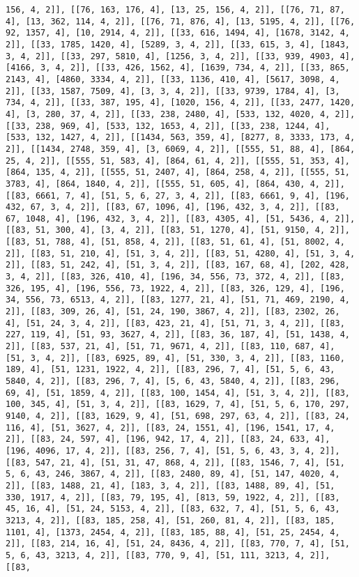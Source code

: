 \documentclass[12pt,fleqn]{article}\usepackage{../../common}
\begin{document}
\begin{verbatim}
156, 4, 2]], [[76, 163, 176, 4], [13, 25, 156, 4, 2]], [[76, 71, 87, 4], [13, 362, 114, 4, 2]], [[76, 71, 876, 4], [13, 5195, 4, 2]], [[76, 92, 1357, 4], [10, 2914, 4, 2]], [[33, 616, 1494, 4], [1678, 3142, 4, 2]], [[33, 1785, 1420, 4], [5289, 3, 4, 2]], [[33, 615, 3, 4], [1843, 3, 4, 2]], [[33, 297, 5810, 4], [1256, 3, 4, 2]], [[33, 939, 4903, 4], [4166, 3, 4, 2]], [[33, 426, 1562, 4], [1639, 734, 4, 2]], [[33, 865, 2143, 4], [4860, 3334, 4, 2]], [[33, 1136, 410, 4], [5617, 3098, 4, 2]], [[33, 1587, 7509, 4], [3, 3, 4, 2]], [[33, 9739, 1784, 4], [3, 734, 4, 2]], [[33, 387, 195, 4], [1020, 156, 4, 2]], [[33, 2477, 1420, 4], [3, 280, 37, 4, 2]], [[33, 238, 2480, 4], [533, 132, 4020, 4, 2]], [[33, 238, 969, 4], [533, 132, 1653, 4, 2]], [[33, 238, 1244, 4], [533, 132, 1427, 4, 2]], [[1434, 563, 359, 4], [8277, 8, 3333, 173, 4, 2]], [[1434, 2748, 359, 4], [3, 6069, 4, 2]], [[555, 51, 88, 4], [864, 25, 4, 2]], [[555, 51, 583, 4], [864, 61, 4, 2]], [[555, 51, 353, 4], [864, 135, 4, 2]], [[555, 51, 2407, 4], [864, 258, 4, 2]], [[555, 51, 3783, 4], [864, 1840, 4, 2]], [[555, 51, 605, 4], [864, 430, 4, 2]], [[83, 6661, 7, 4], [51, 5, 6, 27, 3, 4, 2]], [[83, 6661, 9, 4], [196, 432, 67, 3, 4, 2]], [[83, 67, 1096, 4], [196, 432, 3, 4, 2]], [[83, 67, 1048, 4], [196, 432, 3, 4, 2]], [[83, 4305, 4], [51, 5436, 4, 2]], [[83, 51, 300, 4], [3, 4, 2]], [[83, 51, 1270, 4], [51, 9150, 4, 2]], [[83, 51, 788, 4], [51, 858, 4, 2]], [[83, 51, 61, 4], [51, 8002, 4, 2]], [[83, 51, 210, 4], [51, 3, 4, 2]], [[83, 51, 4280, 4], [51, 3, 4, 2]], [[83, 51, 242, 4], [51, 3, 4, 2]], [[83, 167, 68, 4], [202, 428, 3, 4, 2]], [[83, 326, 410, 4], [196, 34, 556, 73, 372, 4, 2]], [[83, 326, 195, 4], [196, 556, 73, 1922, 4, 2]], [[83, 326, 129, 4], [196, 34, 556, 73, 6513, 4, 2]], [[83, 1277, 21, 4], [51, 71, 469, 2190, 4, 2]], [[83, 309, 26, 4], [51, 24, 190, 3867, 4, 2]], [[83, 2302, 26, 4], [51, 24, 3, 4, 2]], [[83, 423, 21, 4], [51, 71, 3, 4, 2]], [[83, 227, 119, 4], [51, 93, 3627, 4, 2]], [[83, 36, 187, 4], [51, 1438, 4, 2]], [[83, 537, 21, 4], [51, 71, 9671, 4, 2]], [[83, 110, 687, 4], [51, 3, 4, 2]], [[83, 6925, 89, 4], [51, 330, 3, 4, 2]], [[83, 1160, 189, 4], [51, 1231, 1922, 4, 2]], [[83, 296, 7, 4], [51, 5, 6, 43, 5840, 4, 2]], [[83, 296, 7, 4], [5, 6, 43, 5840, 4, 2]], [[83, 296, 69, 4], [51, 1859, 4, 2]], [[83, 100, 1454, 4], [51, 3, 4, 2]], [[83, 100, 345, 4], [51, 3, 4, 2]], [[83, 1629, 7, 4], [51, 5, 6, 170, 297, 9140, 4, 2]], [[83, 1629, 9, 4], [51, 698, 297, 63, 4, 2]], [[83, 24, 116, 4], [51, 3627, 4, 2]], [[83, 24, 1551, 4], [196, 1541, 17, 4, 2]], [[83, 24, 597, 4], [196, 942, 17, 4, 2]], [[83, 24, 633, 4], [196, 4096, 17, 4, 2]], [[83, 256, 7, 4], [51, 5, 6, 43, 3, 4, 2]], [[83, 547, 21, 4], [51, 31, 47, 868, 4, 2]], [[83, 1546, 7, 4], [51, 5, 6, 43, 246, 3867, 4, 2]], [[83, 2480, 89, 4], [51, 147, 4020, 4, 2]], [[83, 1488, 21, 4], [183, 3, 4, 2]], [[83, 1488, 89, 4], [51, 330, 1917, 4, 2]], [[83, 79, 195, 4], [813, 59, 1922, 4, 2]], [[83, 45, 16, 4], [51, 24, 5153, 4, 2]], [[83, 632, 7, 4], [51, 5, 6, 43, 3213, 4, 2]], [[83, 185, 258, 4], [51, 260, 81, 4, 2]], [[83, 185, 1101, 4], [1373, 2454, 4, 2]], [[83, 185, 88, 4], [51, 25, 2454, 4, 2]], [[83, 214, 16, 4], [51, 24, 8436, 4, 2]], [[83, 770, 7, 4], [51, 5, 6, 43, 3213, 4, 2]], [[83, 770, 9, 4], [51, 111, 3213, 4, 2]], [[83, 
\end{verbatim}
\end{document}
